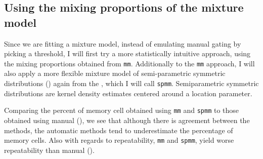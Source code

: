 \subsection{Using the mixing proportions of the mixture model}

Since we are fitting a mixture model, instead of emulating manual gating by picking a threshold,
I will first try a more statistically intuitive approach, using the mixing proportions obtained from \texttt{mm}.
Additionally to the \texttt{mm} approach, I will also apply a more flexible mixture model of semi-parametric symmetric distributions () again from the , which I will call \texttt{spmm}.
Semiparametric symmetric distributions are kernel density estimates centered around a location parameter.

Comparing the percent of memory cell obtained using \texttt{mm} and \texttt{spmm} to those obtained using manual (), we see that
although there is agreement between the methods, the automatic methods tend to underestimate the percentage of memory cells.
Also with regards to repeatability, \texttt{mm} and \texttt{spmm}, yield worse repeatability than manual ().



